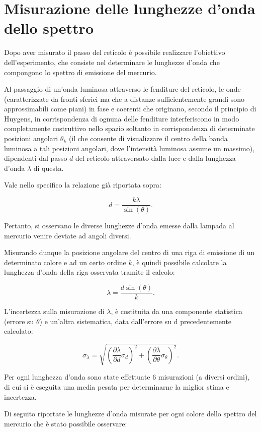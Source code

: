 \documentclass[a4paper,12pt]{article}
\begin{document}
\section{Misurazione delle lunghezze d’onda dello spettro}

Dopo aver misurato il passo del reticolo è possibile realizzare l’obiettivo dell’esperimento, che consiste nel determinare le lunghezze d’onda che compongono lo spettro di emissione del mercurio.

Al passaggio di un’onda luminosa attraverso le fenditure del reticolo, le onde (caratterizzate da fronti sferici ma che a distanze sufficientemente grandi sono approssimabili come piani) in fase e coerenti che originano, secondo il principio di Huygens, in corrispondenza di ognuna delle fenditure interferiscono in modo completamente costruttivo nello spazio soltanto in corrispondenza di determinate posizioni angolari \( \theta_k \) (il che consente di visualizzare il centro della banda luminosa a tali posizioni angolari, dove l’intensità luminosa assume un massimo), dipendenti dal passo \( d \) del reticolo attraversato dalla luce e dalla lunghezza d’onda \( \lambda \) di questa.

Vale nello specifico la relazione già riportata sopra:

\[
d = \frac{k\lambda}{\sin(\theta)}.
\]

Pertanto, si osservano le diverse lunghezze d’onda emesse dalla lampada al mercurio venire deviate ad angoli diversi.

Misurando dunque la posizione angolare del centro di una riga di emissione di un determinato colore e ad un certo ordine \( k \), è quindi possibile calcolare la lunghezza d’onda della riga osservata tramite il calcolo:

\[
\lambda = \frac{d \sin(\theta)}{k}.
\]

L’incertezza sulla misurazione di \( \lambda \), è costituita da una componente statistica (errore su \(\theta\)) e un'altra sistematica, data dall'errore su d precedentemente calcolato:

\[
\sigma_\lambda = \sqrt{\left(\frac{\partial \lambda}{\partial d} \sigma_d\right)^2 + \left(\frac{\partial \lambda}{\partial \theta} \sigma_\theta\right)^2}.
\]

Per ogni lunghezza d’onda sono state effettuate 6 misurazioni (a diversi ordini), di cui si è eseguita una media pesata per determinarne la miglior stima e incertezza.

Di seguito riportate le lunghezze d’onda misurate per ogni colore dello spettro del mercurio che è stato possibile osservare:
\end{document}
